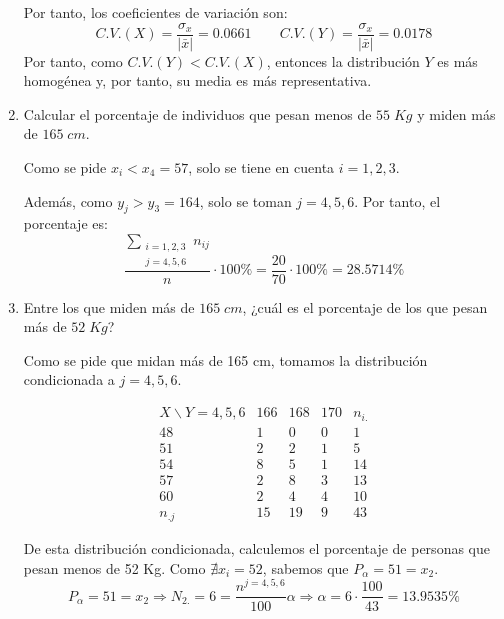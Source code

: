 \begin{ejercicio}
\begin{enumerate}
       Por tanto, los coeficientes de variación son:
       \begin{equation*}
           C.V.(X) = \frac{\sigma_x}{|\bar{x}|} = 0.0661
           \qquad 
           C.V.(Y) = \frac{\sigma_x}{|\bar{x}|} = 0.0178
       \end{equation*}
       Por tanto, como $C.V.(Y)<C.V.(X)$, entonces la distribución $Y$ es más homogénea y, por tanto, su media es más representativa.

        \item Calcular el porcentaje de individuos que pesan menos de $55\; Kg$ y miden más de $165\;cm$.

        Como se pide $x_i < x_4=57$, solo se tiene en cuenta $i=1,2,3$.
        
        Además, como $y_j > y_3 = 164$, solo se toman $j=4,5,6$. Por tanto, el porcentaje es:
        \begin{equation*}
            \frac{\displaystyle \sum_{\substack{i=1,2,3 \\ j=4,5,6}} n_{ij}}{n} \cdot 100\%= \frac{20}{70} \cdot 100\%= 28.5714 \%
        \end{equation*}

        \item Entre los que miden más de $165\;cm$, ¿cuál es el porcentaje de los que pesan más de $52\;Kg$?

        Como se pide que midan más de 165 cm, tomamos la distribución condicionada a $j=4,5,6$.

        \begin{equation*}
            \begin{array}{c|ccc|c}
                X\backslash Y=4,5,6 & 166 & 168 & 170 & n_{i.}\\ \hline
                48 & 1 & 0 & 0 & 1 \\
                51 & 2 & 2 & 1 & 5\\
                54 & 8 & 5 & 1 & 14\\
                57 & 2 & 8 & 3 & 13\\
                60 & 2 & 4 & 4 & 10\\ \hline
                n_{.j} & 15 & 19 & 9 & 43
            \end{array}
        \end{equation*}

        De esta distribución condicionada, calculemos el porcentaje de personas que pesan menos de 52 Kg. Como $\nexists x_i=52$, sabemos que $P_\alpha=51=x_2$.
        \begin{equation*}
            P_\alpha = 51 = x_2 \Longrightarrow N_{2.} = 6 = \frac{n^{j=4,5,6}}{100}\alpha \Longrightarrow \alpha = 6\cdot \frac{100}{43} = 13.9535\%
        \end{equation*}


\end{enumerate}
\end{ejercicio}
